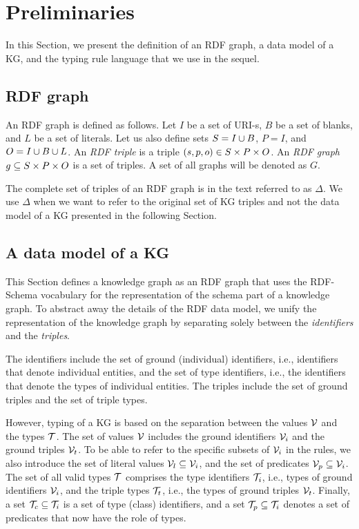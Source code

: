 \documentclass[runningheads]{llncs}
\newcommand{\V}{{\cal V}}
\newcommand{\TT}{{\cal T}}
\begin{document}
\section{Preliminaries\label{sec:prelim}}

In this Section, we present the definition of an RDF graph, a data model
of a KG, and the typing rule language that we use in the sequel.



\subsection{RDF graph\label{sec:kg}}

An RDF graph \cite{rdf} is defined as follows. Let $I$ be a set of
URI-s, $B$ be a set of blanks, and $L$ be a set of literals. Let us
also define sets $S = I\cup\/B$, $P = I$, and $O =
I\cup\/B\cup\/L$. An \emph{RDF triple} is a triple
$(s,p,o)\in\/S\times\/P\times\/O$. An \emph{RDF graph}
$g\subseteq\/S\times\/P\times\/O$ is a set of triples. A set of all
graphs will be denoted as $G$.

The complete set of triples of an RDF graph is in the text
referred to as $\Delta$. We use $\Delta$ when we want to refer
to the original set of KG triples and not the data model of a KG
presented in the following Section.






\subsection{A data model of a KG}

This Section defines a knowledge graph as an RDF graph that uses the
RDF-Schema vocabulary \cite{rdfschema} for the representation of the
schema part of a knowledge graph. To abstract away the details of the
RDF data model, we unify the representation of the knowledge graph by
separating solely between the \emph{identifiers} and the
\emph{triples}.

The identifiers include the set of ground (individual) identifiers,
i.e., identifiers that denote individual entities, and the set of type
identifiers, i.e., the identifiers that denote the types of individual
entities. The triples include the set of ground triples and the set of
triple types.

However, typing of a KG is based on the separation between the values
$\V$ and the types $\TT$. The set of values $\V$ includes the ground
identifiers $\V_i$ and the ground triples $\V_t$. To be able to refer
to the specific subsets of $\V_i$ in the rules, we also introduce the
set of literal values $\V_l\subseteq\V_i$, and the set of predicates
$\V_p\subseteq\V_i$. The set of all valid types $\TT$ comprises the
type identifiers $\TT_i$, i.e., types of ground identifiers $\V_i$,
and the triple types $\TT_t$, i.e., the types of ground triples
$\V_t$.  Finally, a set $\TT_c\subseteq\TT_i$ is a set of type (class)
identifiers, and a set $\TT_p\subseteq\TT_i$ denotes a set of
predicates that now have the role of types.
\end{document}
